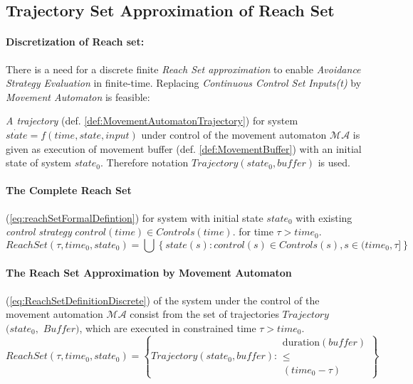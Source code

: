 \subsection{Trajectory Set Approximation of Reach Set}\label{sec:trajectory set Reach set approximation}
    \paragraph{Discretization of Reach set:} There is a need for a discrete finite \emph{Reach Set approximation} to enable \emph{Avoidance Strategy Evaluation} in finite-time. Replacing \emph{Continuous Control Set} \emph{Inputs(t)} by \emph{Movement Automaton} is feasible:
    
    
    \begin{definition}\label{def:ReachSetApproximationByMovementAutomaton}
        \emph{A trajectory} (def. \ref{def:MovementAutomatonTrajectory}) for system $\dot{state}=f(time,state,input)$ under control of the movement automaton $\mathscr{MA}$ is given as execution of movement buffer (def. \ref{def:MovementBuffer}) with an initial state of system $state_0$.  Therefore notation $Trajectory(state_0,buffer)$ is used.
    
        
        \paragraph{The Complete Reach Set} (\ref{eq:reachSetFormalDefintion}) for system with initial state $state_0$ with existing \emph{control strategy} $control(time)\in Controls(time)$. for time  $\tau > time_0$.
        \begin{equation}\label{eq:reachSetFormalDefintion}
            ReachSet(\tau,time_0,state_0) = \bigcup \left\{state(s):control(s)\in Controls(s), s\in (time_0,\tau]\right\} 
        \end{equation}
        
        
        \paragraph{The Reach Set Approximation by Movement Automaton} (\ref{eq:ReachSetDefinitionDiscrete}) of the system under the control of the movement automation $\mathscr{MA}$ consist from the set of trajectories $Trajectory$ $(state_0,$ $Buffer)$, which are executed in constrained time $\tau > time_0$.
        \begin{equation}\label{eq:ReachSetDefinitionDiscrete}
             ReachSet(\tau,time_0,state_0)=\left\{Trajectory(state_0,buffer):
             \begin{gathered}
                \text{duration}(buffer)\\ \le\\ (time_0-\tau)
             \end{gathered}\right\}
        \end{equation}
    \end{definition}
    
